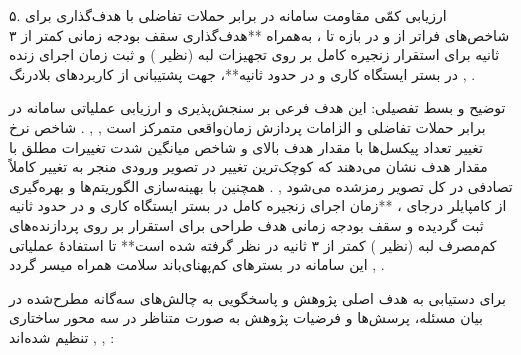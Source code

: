 

۵. ارزیابی کمّی مقاومت سامانه در برابر حملات تفاضلی با هدف‌گذاری برای شاخص‌های  فراتر از  و  در بازه  تا ، به‌همراه **هدف‌گذاری سقف بودجه زمانی کمتر از ۳ ثانیه برای استقرار زنجیره کامل بر روی تجهیزات لبه (نظیر ) و ثبت زمان اجرای زنده در بستر ایستگاه کاری و  در حدود  ثانیه**، جهت پشتیبانی از کاربردهای بلادرنگ , .\par

توضیح و بسط تفصیلی: این هدف فرعی بر سنجش‌پذیری و ارزیابی عملیاتی سامانه در برابر حملات تفاضلی و الزامات پردازش زمان‌واقعی  متمرکز است , , . شاخص نرخ تغییر تعداد پیکسل‌ها  با مقدار هدف بالای  و شاخص میانگین شدت تغییرات مطلق  با مقدار هدف  نشان می‌دهند که کوچک‌ترین تغییر در تصویر ورودی منجر به تغییر کاملاً تصادفی در کل تصویر رمزشده می‌شود , . همچنین با بهینه‌سازی الگوریتم‌ها و بهره‌گیری از کامپایلر درجای ، **زمان اجرای زنجیره کامل در بستر ایستگاه کاری و  در حدود  ثانیه ثبت گردیده و سقف بودجه زمانی هدف طراحی برای استقرار بر روی پردازنده‌های کم‌مصرف لبه  (نظیر ) کمتر از ۳ ثانیه در نظر گرفته شده است** تا استفادهٔ عملیاتی این سامانه در بسترهای کم‌پهنای‌باند سلامت همراه میسر گردد , .\par





برای دستیابی به هدف اصلی پژوهش و پاسخگویی به چالش‌های سه‌گانه مطرح‌شده در بیان مسئله، پرسش‌ها و فرضیات پژوهش به صورت متناظر در سه محور ساختاری تنظیم شده‌اند , , :\par




